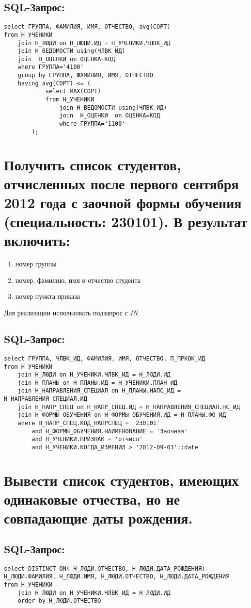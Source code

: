 \subsection{SQL-Запрос:}
\begin{verbatim}
select ГРУППА, ФАМИЛИЯ, ИМЯ, ОТЧЕСТВО, avg(СОРТ)
from Н_УЧЕНИКИ
    join Н_ЛЮДИ on Н_ЛЮДИ.ИД = Н_УЧЕНИКИ.ЧЛВК_ИД
    join Н_ВЕДОМОСТИ using(ЧЛВК_ИД)
    join  Н_ОЦЕНКИ on ОЦЕНКА=КОД
    where ГРУППА='4100'
    group by ГРУППА, ФАМИЛИЯ, ИМЯ, ОТЧЕСТВО
    having avg(СОРТ) <= (
            select MAX(СОРТ)
            from Н_УЧЕНИКИ
                join Н_ВЕДОМОСТИ using(ЧЛВК_ИД)
                join  Н_ОЦЕНКИ  on ОЦЕНКА=КОД
                where ГРУППА='1100'
        );
\end{verbatim}

\newpage
\section{Получить список студентов, отчисленных после первого сентября 2012 года с заочной формы обучения (специальность: 230101). В результат включить:}
\begin{enumerate}
	\item номер группы
	\item номер, фамилию, имя и отчество студента
	\item номер пункта приказа
\end{enumerate}

Для реализации использовать подзапрос с \textit{IN}.

\subsection{SQL-Запрос:}
\begin{verbatim}
select ГРУППА, ЧЛВК_ИД, ФАМИЛИЯ, ИМЯ, ОТЧЕСТВО, П_ПРКОК_ИД
from Н_УЧЕНИКИ
    join Н_ЛЮДИ on Н_УЧЕНИКИ.ЧЛВК_ИД = Н_ЛЮДИ.ИД
    join Н_ПЛАНЫ on Н_ПЛАНЫ.ИД = Н_УЧЕНИКИ.ПЛАН_ИД
    join Н_НАПРАВЛЕНИЯ_СПЕЦИАЛ on Н_ПЛАНЫ.НАПС_ИД = Н_НАПРАВЛЕНИЯ_СПЕЦИАЛ.ИД
    join Н_НАПР_СПЕЦ on Н_НАПР_СПЕЦ.ИД = Н_НАПРАВЛЕНИЯ_СПЕЦИАЛ.НС_ИД
    join Н_ФОРМЫ_ОБУЧЕНИЯ on Н_ФОРМЫ_ОБУЧЕНИЯ.ИД = Н_ПЛАНЫ.ФО_ИД
    where Н_НАПР_СПЕЦ.КОД_НАПРСПЕЦ = '230101'
        and Н_ФОРМЫ_ОБУЧЕНИЯ.НАИМЕНОВАНИЕ = 'Заочная'
        and Н_УЧЕНИКИ.ПРИЗНАК = 'отчисл'
        and Н_УЧЕНИКИ.КОГДА_ИЗМЕНИЛ > '2012-09-01'::date
\end{verbatim}

\newpage
\section{Вывести список студентов, имеющих одинаковые отчества, но не совпадающие даты рождения.}

\subsection{SQL-Запрос:}
\begin{verbatim}
select DISTINCT ON( Н_ЛЮДИ.ОТЧЕСТВО, Н_ЛЮДИ.ДАТА_РОЖДЕНИЯ) Н_ЛЮДИ.ФАМИЛИЯ, Н_ЛЮДИ.ИМЯ, Н_ЛЮДИ.ОТЧЕСТВО, Н_ЛЮДИ.ДАТА_РОЖДЕНИЯ
from Н_УЧЕНИКИ
    join Н_ЛЮДИ on Н_УЧЕНИКИ.ЧЛВК_ИД = Н_ЛЮДИ.ИД
    order by Н_ЛЮДИ.ОТЧЕСТВО
\end{verbatim}